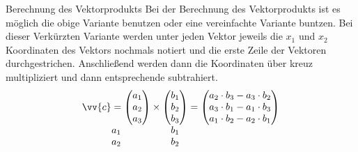 \begin{b8d*}{Berechnung des Vektorprodukts}{}
    Bei der Berechnung des Vektorprodukts ist es möglich die obige Variante benutzen oder eine vereinfachte Variante buntzen. Bei dieser Verkürzten Variante werden unter jeden Vektor jeweils die $x_1$ und $x_2$ Koordinaten des Vektors nochmals notiert und die erste Zeile der Vektoren durchgestrichen. Anschließend werden dann die Koordinaten über kreuz multipliziert und dann entsprechende subtrahiert.
\[
\begin{array}[t]{@{}c@{}}
\vv{c}=\begin{pmatrix} a_1 \\ a_2 \\ a_3 \end{pmatrix} \\ a_1 \\ a_2
\end{array}
\times
\begin{array}[t]{@{}c@{}}
\begin{pmatrix} b_1 \\ b_2 \\ b_3 \end{pmatrix} \\ b_1 \\ b_2
\end{array}
=
\begin{pmatrix}
a_2\cdot b_3-a_3\cdot b_2 \\
a_3\cdot b_1-a_1\cdot b_3 \\
a_1\cdot b_2-a_2\cdot b_1
\end{pmatrix}
\] 
\begin{center}
\end{center}
\end{b8d*}
